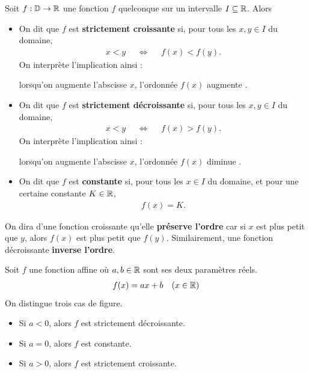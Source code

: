 \documentclass[a4paper, 12pt]{report}
\begin{document}
\begin{defn}[variations]
	Soit $f : \mathbb{D} \rightarrow \mathbb{R}$ une fonction $f$ quelconque sur un intervalle $I\subseteq\mathbb{R}$.
	Alors
		\begin{itemize}
			\item On dit que $f$ est \textbf{strictement croissante} si, pour tous les $x,y\in I$ du domaine,
				\begin{align*}
					x < y && \iff && f(x) < f(y).
				\end{align*}	
			On interprète l'implication ainsi :
			\begin{center}
				\og lorsqu'on augmente l'abscisse $x$, l'ordonnée $f(x)$ augmente \fg.
			\end{center}
				
			\item On dit que $f$ est \textbf{strictement décroissante} si, pour tous les $x,y\in I$ du domaine,
				\begin{align*}
					x < y && \iff && f(x) > f(y).
				\end{align*}
			On interprète l'implication ainsi :
			\begin{center}
				\og lorsqu'on augmente l'abscisse $x$, l'ordonnée $f(x)$ diminue \fg.
			\end{center}
				
			\item On dit que $f$ est \textbf{constante} si, pour tous les $x\in I$ du domaine, et pour une certaine constante $K\in\mathbb{R}$,
				\begin{align*}
					f(x) = K.
				\end{align*}
		\end{itemize}
\end{defn}

\begin{rmq}
	On dira d'une fonction croissante qu'elle \textbf{préserve l'ordre} car si $x$ est plus petit que $y$, alors $f(x)$ est plus petit que $f(y)$.
	Similairement, une fonction décroissante \textbf{inverse l'ordre}.
\end{rmq}

\begin{thm}
	Soit $f$ une fonction affine où $a, b \in\mathbb{R}$ sont ses deux paramètres réels.
		\begin{align*}
			f(x) = a x + b && (x\in\mathbb{R})
		\end{align*}
	On distingue trois cas de figure.
		\begin{itemize}
			\item Si $a < 0$, alors $f$ est strictement décroissante.
			\item Si $a=0$, alors $f$ est constante.
			\item Si $a>0$, alors $f$ est strictement croissante.
		\end{itemize}
\end{thm}
\end{document}
